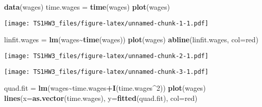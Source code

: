 \documentclass[
]{article}
\newenvironment{Shaded}{\begin{snugshade}}{\end{snugshade}}
\newcommand{\AttributeTok}[1]{\textcolor[rgb]{0.13,0.29,0.53}{#1}}
\newcommand{\DecValTok}[1]{\textcolor[rgb]{0.00,0.00,0.81}{#1}}
\newcommand{\FunctionTok}[1]{\textcolor[rgb]{0.13,0.29,0.53}{\textbf{#1}}}
\newcommand{\NormalTok}[1]{#1}
\newcommand{\OtherTok}[1]{\textcolor[rgb]{0.56,0.35,0.01}{#1}}
\newcommand{\SpecialCharTok}[1]{\textcolor[rgb]{0.81,0.36,0.00}{\textbf{#1}}}
\newcommand{\StringTok}[1]{\textcolor[rgb]{0.31,0.60,0.02}{#1}}
\begin{document}
\begin{Shaded}
\begin{Highlighting}[]
\FunctionTok{data}\NormalTok{(wages)}
\NormalTok{time.wages }\OtherTok{=} \FunctionTok{time}\NormalTok{(wages)}
\FunctionTok{plot}\NormalTok{(wages)}
\end{Highlighting}
\end{Shaded}

\texttt{[image: TS1HW3\_files/figure-latex/unnamed-chunk-1-1.pdf]}

\begin{Shaded}
\begin{Highlighting}[]
\NormalTok{linfit.wages }\OtherTok{=} \FunctionTok{lm}\NormalTok{(wages}\SpecialCharTok{\textasciitilde{}}\FunctionTok{time}\NormalTok{(wages))}
\FunctionTok{plot}\NormalTok{(wages)}
\FunctionTok{abline}\NormalTok{(linfit.wages, }\AttributeTok{col=}\StringTok{\textquotesingle{}red\textquotesingle{}}\NormalTok{)}
\end{Highlighting}
\end{Shaded}

\texttt{[image: TS1HW3\_files/figure-latex/unnamed-chunk-2-1.pdf]}

\begin{Shaded}
\end{Shaded}

\texttt{[image: TS1HW3\_files/figure-latex/unnamed-chunk-3-1.pdf]}

\begin{Shaded}
\begin{Highlighting}[]
\NormalTok{quad.fit }\OtherTok{=} \FunctionTok{lm}\NormalTok{(wages}\SpecialCharTok{\textasciitilde{}}\NormalTok{time.wages}\SpecialCharTok{+}\FunctionTok{I}\NormalTok{(time.wages}\SpecialCharTok{\^{}}\DecValTok{2}\NormalTok{))}
\FunctionTok{plot}\NormalTok{(wages)}
\FunctionTok{lines}\NormalTok{(}\AttributeTok{x=}\FunctionTok{as.vector}\NormalTok{(time.wages), }\AttributeTok{y=}\FunctionTok{fitted}\NormalTok{(quad.fit), }\AttributeTok{col=}\StringTok{\textquotesingle{}red\textquotesingle{}}\NormalTok{)}
\end{Highlighting}
\end{Shaded}
\end{document}

